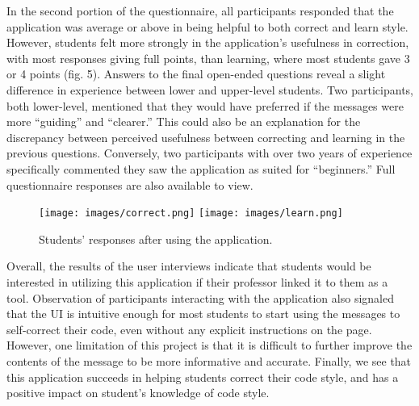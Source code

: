\documentclass[10pt,twocolumn]{article}
\begin{document}
In the second portion of the questionnaire, all participants responded that the application was average or above in being helpful to both correct and learn style.
However, students felt more strongly in the application's usefulness in correction, with most responses giving full points, than learning, where most students gave 3 or 4 points (fig. 5). 
Answers to the final open-ended questions reveal a slight difference in experience between lower and upper-level students. 
Two participants, both lower-level, mentioned that they would have preferred if the messages were more “guiding” and “clearer.” 
This could also be an explanation for the discrepancy between perceived usefulness between correcting and learning in the previous questions. 
Conversely, two participants with over two years of experience specifically commented they saw the application as suited for “beginners.”
Full questionnaire responses are also available to view.

\begin{figure}
\texttt{[image: images/correct.png]}
\texttt{[image: images/learn.png]}
\centering
\vspace{.5cm}
\caption{Students’ responses after using the application.}
\end{figure}

Overall, the results of the user interviews indicate that students would be interested in utilizing this application if their professor linked it to them as a tool. 
Observation of participants interacting with the application also signaled that the UI is intuitive enough for most students to start using the messages to self-correct their code, even without any explicit instructions on the page. 
However, one limitation of this project is that it is difficult to further improve the contents of the message to be more informative and accurate. 
Finally, we see that this application succeeds in helping students correct their code style, and has a positive impact on student's knowledge of code style. 
\end{document}
